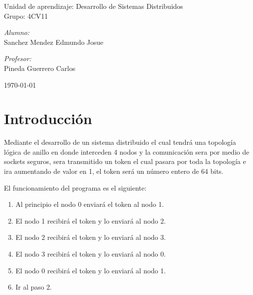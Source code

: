 \documentclass[11pt]{article}
\begin{document}
\begin{titlepage}
\begin{center}
				{ \Large Unidad de aprendizaje: Desarrollo de Sistemas Distribuidos} \\[1cm]
				
				{ \Large Grupo: 4CV11 } \\[1cm]
				
				\noindent
				\begin{minipage}{0.5\textwidth}
					\begin{flushleft} \large
						\emph{Alumno:} \\
						Sanchez Mendez Edmundo Josue
					\end{flushleft}
				\end{minipage}%
				\begin{minipage}{0.5\textwidth}
					\begin{flushright} \large
						\emph{Profesor:} \\
						Pineda Guerrero Carlos 
					\end{flushright}
				\end{minipage}
				
				\vfill
				{\large {\today}}
			\end{center}
		\end{titlepage}
	
	\titlepage
	\tableofcontents
	\newpage
	
	\section{Introducción}
		Mediante el desarrollo de un sistema distribuido el cual tendrá una topología lógica de anillo en donde interceden 4 nodos y la comunicación sera por medio de sockets seguros, sera transmitido un token el cual pasara por toda la topología e ira aumentando de valor en 1, el token será un número entero de 64 bits.\par	
		El funcionamiento del programa es el siguiente:
		\begin{enumerate}
			\item Al principio el nodo 0 enviará el token al nodo 1.
			\item El nodo 1 recibirá el token y lo enviará al nodo 2.
			\item El nodo 2 recibirá el token y lo enviará al nodo 3.
			\item El nodo 3 recibirá el token y lo enviará al nodo 0.
			\item El nodo 0 recibirá el token y lo enviará al nodo 1.
			\item Ir al paso 2.
		\end{enumerate}
\end{document}
